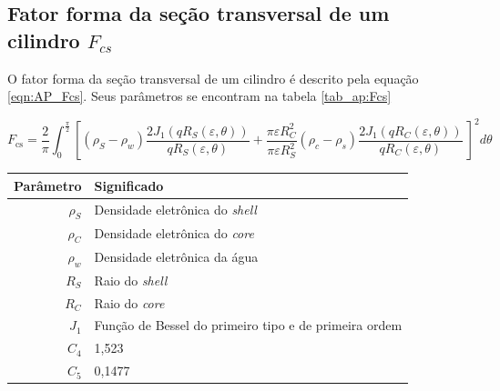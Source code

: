 \begin{apendicesenv}
\subsection{Fator forma da seção transversal de um cilindro $F_{cs}$}

O fator forma da seção transversal de um cilindro é descrito pela equação \ref{eqn:AP_Fcs}. Seus parâmetros se encontram na tabela \ref{tab_ap:Fcs}

\begin{equation}
F_{\text{cs}} = \frac{2}{\pi}\int_{0}^{\frac{\pi}{2}}%
%
\left[ \left(\rho_{S} - \rho_{w} \right) \frac{2J_1 \left( qR_{S}\left( \varepsilon,\theta \right) \right)}{qR_{S}\left( \varepsilon,\theta \right)} %
%
+  %
%
\frac{\pi\varepsilon R_C^2}{\pi\varepsilon R_S^2}\left( \rho_c - \rho_s \right)	%
%
\frac{2J_1\left( qR_{C}\left( \varepsilon,\theta \right) \right)}{qR_{C}\left( \varepsilon,\theta \right)}\  \right]^2 d\theta
\label{eqn:AP_Fcs}
\end{equation}


\begin{table}
    {\begin{tabular}{r l}
            \toprule
            Parâmetro 			& Significado \\
            \midrule
            $\rho_S$			&  Densidade eletrônica do \emph{shell} \\
            $\rho_C$			&  Densidade eletrônica do \emph{core}  \\
            $\rho_w$			&  Densidade eletrônica da água			\\
            $R_S$			& Raio do \emph{shell} 						\\
            $R_C$			& Raio do \emph{core}						\\
            $J_1$			&  Função de Bessel do primeiro tipo e de primeira ordem\\
            $C_4$			&  1,523	\\
            $C_5$			&  0,1477 	\\						
            \bottomrule
        \end{tabular}}%
    {}%
\end{table}


\end{apendicesenv}
